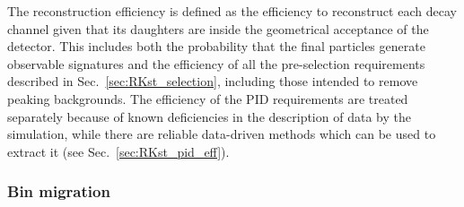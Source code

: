 The reconstruction efficiency is defined as the efficiency to reconstruct
each decay channel given that its daughters are inside the geometrical acceptance
of the detector. This includes both the probability that the final particles generate
observable signatures and the efficiency of all the pre-selection requirements described
in Sec.~\ref{sec:RKst_selection}, including those intended to remove peaking backgrounds. 
The efficiency of the PID requirements are treated separately because of known deficiencies in the description 
of data by the simulation, while there are reliable data-driven methods which can be used to 
extract it (see Sec.~\ref{sec:RKst_pid_eff}).

\subsubsection{Bin migration}

